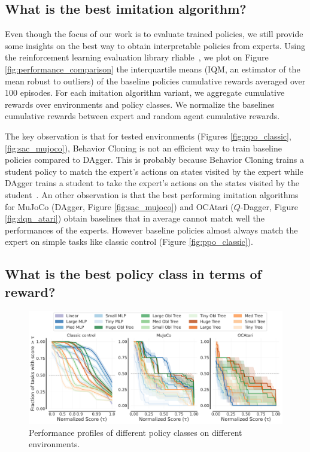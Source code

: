 \subsection{What is the best imitation algorithm?}
Even though the focus of our work is to evaluate trained policies, we still provide some insights on the best way to obtain interpretable policies from experts. Using the reinforcement learning evaluation library rliable~\cite{rliable}, we plot on Figure \ref{fig:performance_comparison} the interquartile means (IQM, an estimator of the mean robust to outliers) of the baseline policies cumulative rewards averaged over 100 episodes. For each imitation algorithm variant, we aggregate cumulative rewards over environments and policy classes. We normalize the baselines cumulative rewards between expert and random agent cumulative rewards.

The key observation is that for tested environments (Figures \ref{fig:ppo_classic},\ref{fig:sac_mujoco}), Behavior Cloning is not an efficient way to train baseline policies compared to DAgger. This is probably because Behavior Cloning trains a student policy to match the expert's actions on states visited by the expert while DAgger trains a student to take the expert's actions on the states visited by the student~\cite{dagger}. An other observation is that the best performing imitation algorithms for MuJoCo (DAgger, Figure \ref{fig:sac_mujoco}) and OCAtari ($Q$-Dagger, Figure \ref{fig:dqn_atari}) obtain baselines that in average cannot match well the performances of the experts. However baseline policies almost always match the expert on simple tasks like classic control (Figure \ref{fig:ppo_classic}).

\subsection{What is the best policy class in terms of reward?}

\begin{figure}[ht]
    \centering
    \includegraphics[trim={0 0 0 0.2cm},clip,width=0.9\linewidth]{images/images_part3/perf_profile_combined_100k.pdf}
    \caption{Performance profiles of different policy classes on different environments.}
    \label{fig:perf-combined}
\end{figure}

